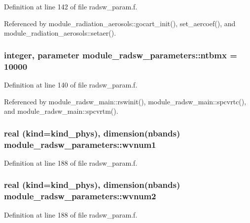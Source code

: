 Definition at line 142 of file radsw\+\_\+param.\+f.



Referenced by module\+\_\+radiation\+\_\+aerosols\+::gocart\+\_\+init(), set\+\_\+aercoef(), and module\+\_\+radiation\+\_\+aerosols\+::setaer().

\subsubsection[{\texorpdfstring{ntbmx}{ntbmx}}]{\setlength{\rightskip}{0pt plus 5cm}integer, parameter module\+\_\+radsw\+\_\+parameters\+::ntbmx = 10000}\hypertarget{namespacemodule__radsw__parameters_a4bd72558be40bfccfb78c48e640acd07}{}\label{namespacemodule__radsw__parameters_a4bd72558be40bfccfb78c48e640acd07}


Definition at line 140 of file radsw\+\_\+param.\+f.



Referenced by module\+\_\+radsw\+\_\+main\+::rswinit(), module\+\_\+radsw\+\_\+main\+::spcvrtc(), and module\+\_\+radsw\+\_\+main\+::spcvrtm().

\subsubsection[{\texorpdfstring{wvnum1}{wvnum1}}]{\setlength{\rightskip}{0pt plus 5cm}real (kind=kind\+\_\+phys), dimension({\bf nbands}) module\+\_\+radsw\+\_\+parameters\+::wvnum1}\hypertarget{namespacemodule__radsw__parameters_adc7827bd2bed6502a0a60b40b8f1deeb}{}\label{namespacemodule__radsw__parameters_adc7827bd2bed6502a0a60b40b8f1deeb}


Definition at line 188 of file radsw\+\_\+param.\+f.

\subsubsection[{\texorpdfstring{wvnum2}{wvnum2}}]{\setlength{\rightskip}{0pt plus 5cm}real (kind=kind\+\_\+phys), dimension({\bf nbands}) module\+\_\+radsw\+\_\+parameters\+::wvnum2}\hypertarget{namespacemodule__radsw__parameters_a88594ac7d3fbf13f2fdbac4b3b844d88}{}\label{namespacemodule__radsw__parameters_a88594ac7d3fbf13f2fdbac4b3b844d88}


Definition at line 188 of file radsw\+\_\+param.\+f.

